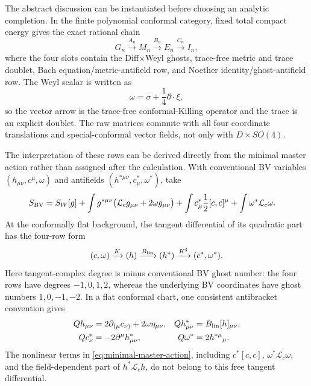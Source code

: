 \documentclass[11pt]{article}
\theoremstyle{definition}
\theoremstyle{remark}
\newcommand{\cL}{\mathcal L}
\begin{document}
The abstract discussion can be instantiated before choosing an analytic
completion.  In the finite polynomial conformal category, fixed total
compact energy gives the exact rational chain
\begin{equation}\label{eq:raw-polynomial-chain}
 G_n\xrightarrow{A_n}M_n\xrightarrow{B_n}E_n
 \xrightarrow{C_n}I_n,
\end{equation}
where the four slots contain the Diff$\times$Weyl ghosts, trace-free metric
and trace doublet, Bach equation/metric-antifield row, and Noether
identity/ghost-antifield row.  The Weyl scalar is written as
\begin{equation}
 \omega=\sigma+\frac14\partial\!\cdot\!\xi,
\end{equation}
so the vector arrow is the trace-free conformal-Killing operator and the
trace is an explicit doublet.  The raw matrices commute with all four
coordinate translations and special-conformal vector fields, not only with
$D\times SO(4)$.

The interpretation of these rows can be derived directly from the minimal
master action rather than assigned after the calculation.  With conventional
BV variables $(h_{\mu\nu},c^\mu,\omega)$ and antifields
$(h^{*\mu\nu},c^*_\mu,\omega^*)$, take
\begin{align}\label{eq:minimal-master-action}
 S_{\rm BV}={}&S_W[g]
 +\int g^{*\mu\nu}\bigl(\cL_cg_{\mu\nu}+2\omega g_{\mu\nu}\bigr)
 +\int c^*_\mu\frac12[c,c]^\mu
 +\int\omega^*\cL_c\omega .
\end{align}
At the conformally flat background, the tangent differential of its
quadratic part has the four-row form
\begin{equation}\label{eq:field-BV-tangent-chain}
 (c,\omega)\xrightarrow{K}(h)
 \xrightarrow{B_{\rm lin}}(h^*)
 \xrightarrow{K^\sharp}(c^*,\omega^*).
\end{equation}
Here tangent-complex degree is minus conventional BV ghost number: the four
rows have degrees $-1,0,1,2$, whereas the underlying BV coordinates have
ghost numbers $1,0,-1,-2$.  In a flat conformal chart, one consistent
antibracket convention gives
\begin{align}
 Qh_{\mu\nu}&=2\partial_{(\mu}c_{\nu)}+2\omega\eta_{\mu\nu},
 &Qh^*_{\mu\nu}&=B_{\rm lin}[h]_{\mu\nu},\nonumber\\
 Qc^*_\nu&=-2\partial^\mu h^*_{\mu\nu},
 &Q\omega^*&=2h^{*\mu}{}_{\mu}.
 \label{eq:quadratic-field-BV-differential}
\end{align}
The nonlinear terms in \eqref{eq:minimal-master-action}, including
$c^*[c,c]$, $\omega^*\cL_c\omega$, and the field-dependent part of
$h^*\cL_ch$, do not belong to this free tangent differential.
\end{document}
